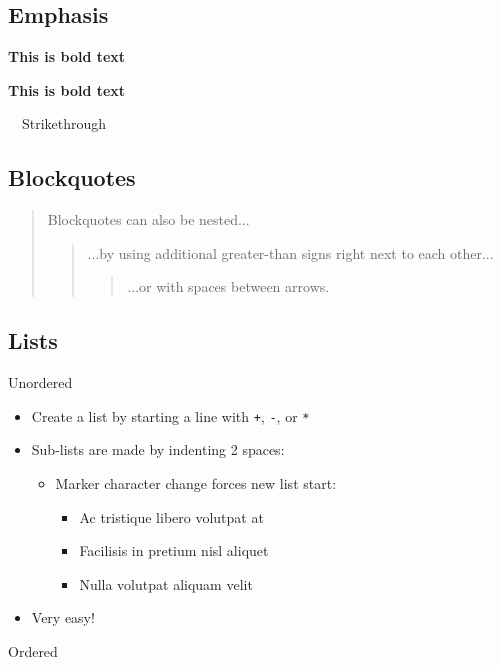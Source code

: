 \documentclass{article}
\begin{document}
\subsection{Emphasis}

\textbf{This is bold text}

\textbf{This is bold text}



~~Strikethrough~~



\subsection{Blockquotes}



\begin{quote}
Blockquotes can also be nested...\begin{quote}
...by using additional greater-than signs right next to each other...\begin{quote}
...or with spaces between arrows.
\end{quote}
\end{quote}
\end{quote}



\subsection{Lists}

Unordered

\begin{itemize}
\item Create a list by starting a line with \verb|+|, \verb|-|, or \verb|*|
\item Sub-lists are made by indenting 2 spaces:\begin{itemize}
\item Marker character change forces new list start:\begin{itemize}
\item Ac tristique libero volutpat at
\end{itemize}
\begin{itemize}
\item Facilisis in pretium nisl aliquet
\end{itemize}
\begin{itemize}
\item Nulla volutpat aliquam velit
\end{itemize}

\end{itemize}

\item Very easy!


\end{itemize}
Ordered
\end{document}
